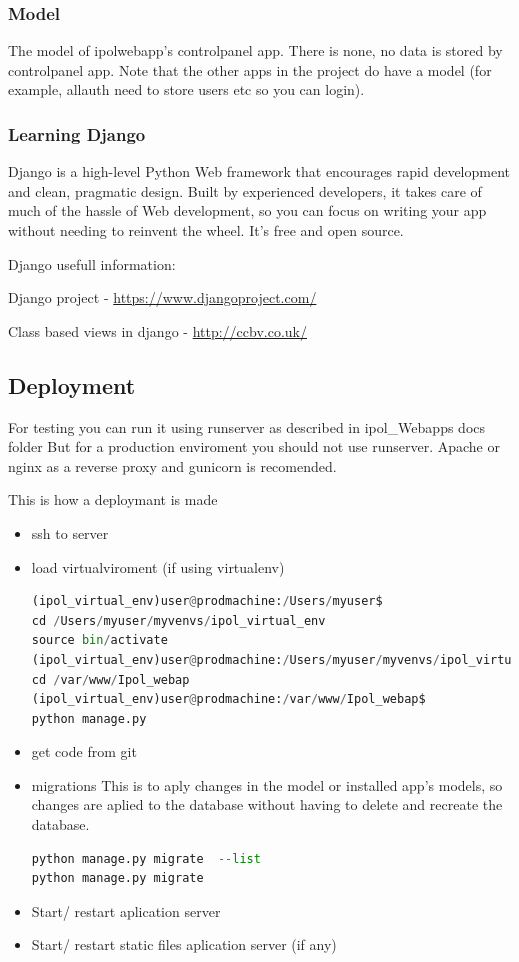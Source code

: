 \subsubsection{Model}
The model of ipolwebapp's controlpanel app.
There is none, no data is stored by controlpanel app.
Note that the other apps in the project do have a model (for example, allauth need to store users etc so you can login).


\subsubsection{Learning Django}
Django is a high-level Python Web framework that encourages rapid development and clean, pragmatic design. Built by experienced developers, it takes care of much of the hassle of Web development, so you can focus on writing your app without needing to reinvent the wheel. It’s free and open source.

Django usefull information:

Django project - \url{https://www.djangoproject.com/}

Class based views in django - \url{http://ccbv.co.uk/}

\subsection{Deployment}

For testing you can run it using runserver as described in ipol\_Webapps docs folder
But for a production enviroment you should not use runserver. Apache or nginx as a reverse proxy and gunicorn is recomended.

This is how a deploymant is made

\begin{itemize}
\item  ssh to server 
\item  load virtualviroment (if using virtualenv)
\begin{lstlisting}[language=Python,firstnumber=1]
(ipol_virtual_env)user@prodmachine:/Users/myuser$
cd /Users/myuser/myvenvs/ipol_virtual_env
source bin/activate
(ipol_virtual_env)user@prodmachine:/Users/myuser/myvenvs/ipol_virtual_env$
cd /var/www/Ipol_webap
(ipol_virtual_env)user@prodmachine:/var/www/Ipol_webap$ 
python manage.py 
\end{lstlisting}
\item  get code from git
\item  migrations
This is to aply changes in the model or installed app's models, so changes are aplied to the database without having to delete and recreate the database.
\begin{lstlisting}[language=Python,firstnumber=1]
python manage.py migrate  --list
python manage.py migrate
\end{lstlisting}
\item  Start/ restart aplication server
\item  Start/ restart static files aplication server (if any)

\end{itemize}



